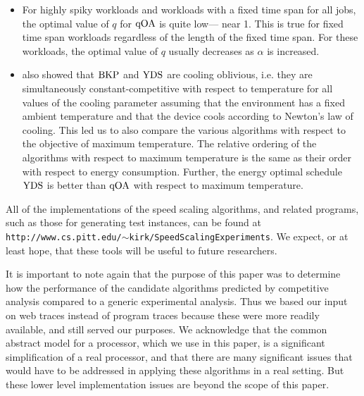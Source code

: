 \documentclass[11pt]{article}
\newcommand{\YDS}{{\rm YDS}}
\newcommand{\BKP}{{\rm BKP}}
\newcommand{\qOA}{{\rm qOA}}
\newcommand{\mycomment}[1]{ }
\begin{document}
\begin{itemize}
\item For highly spiky workloads and workloads with a fixed time span
  for all jobs, the optimal value of $q$ for $\qOA$ is quite low---
  near 1.
  This is true for fixed time span workloads regardless of the length
  of the fixed time span. 
  For these workloads, the optimal value of $q$ usually decreases as
  $\alpha$ is increased.
\mycomment{
\item As $\alpha$ is increased, optimal $q$ of $\qOA$ usually decreases
  for highly spiky and fixed time span workloads. For both types of
  workload optimal $q$ is quite low - near 1 - which means that
  running faster is not beneficial, and with a greater value of
  $\alpha$ even more energy is consumed that it makes sense to use
  smaller values of $q$ to reduce consumed energy.
}

\item
\cite{BKP} also showed that $\BKP$ and $\YDS$ are cooling oblivious, i.e.
they are simultaneously constant-competitive with
respect to temperature for all values of the cooling parameter
assuming that the environment
has a fixed ambient temperature and that the device cools
according to Newton's law of cooling.
This led us to also compare the various algorithms with respect to 
the objective of maximum temperature.
The relative ordering of the algorithms with respect to maximum
temperature is the same as their order with
respect to energy consumption. Further, the energy optimal schedule $\YDS$ is better
than $\qOA$ with respect to maximum temperature.

\end{itemize}
All of the implementations of the speed scaling algorithms, and related programs, such as 
those for generating test instances, can be found at 
{\tt http://www.cs.pitt.edu/$\sim$kirk/SpeedScalingExperiments}.
We expect, or at least hope, that these tools will be useful to future researchers.


It is important to note again that the purpose of this paper was to determine how
the performance of the candidate algorithms predicted by competitive
analysis compared to a generic experimental analysis.
Thus we based our input on web traces instead of program traces because
these were more readily available, and still served our purposes.
We acknowledge that the common abstract model for a processor, which we
use in this paper, is a significant simplification of a real processor, and 
that there
are many significant issues that would  have to be addressed in applying
these algorithms in a real setting. But these lower level implementation 
issues are beyond the scope of
this paper.
\end{document}
